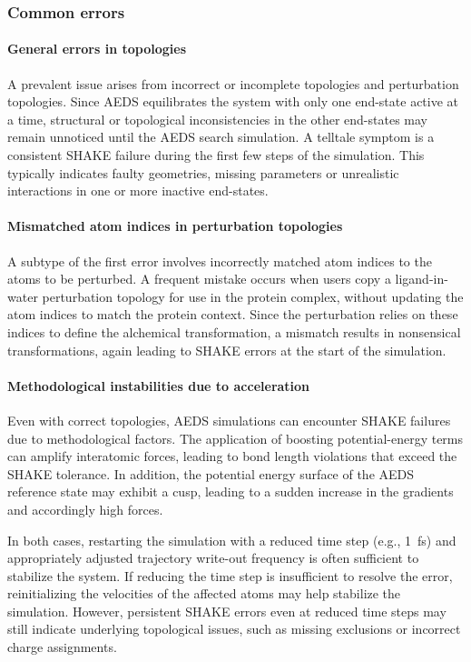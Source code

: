 \subsubsection{Common errors}

\paragraph{General errors in topologies}  
A prevalent issue arises from incorrect or incomplete topologies and perturbation topologies. Since AEDS equilibrates the system with only one end-state active at a time, structural or topological inconsistencies in the other end-states may remain unnoticed until the AEDS search simulation. A telltale symptom is a consistent SHAKE failure during the first few steps of the simulation. This typically indicates faulty geometries, missing parameters or unrealistic interactions in one or more inactive end-states.

\paragraph{Mismatched atom indices in perturbation topologies}  
A subtype of the first error involves incorrectly matched atom indices to the atoms to be perturbed. A frequent mistake occurs when users copy a ligand-in-water perturbation topology for use in the protein complex, without updating the atom indices to match the protein context. Since the perturbation relies on these indices to define the alchemical transformation, a mismatch results in nonsensical transformations, again leading to SHAKE errors at the start of the simulation.

\paragraph{Methodological instabilities due to acceleration}  
Even with correct topologies, AEDS simulations can encounter SHAKE failures due to methodological factors. The application of boosting potential-energy terms can amplify interatomic forces, leading to bond length violations that exceed the SHAKE tolerance. In addition, the potential energy surface of the AEDS reference state may exhibit a cusp, leading to a sudden increase in the gradients and accordingly high forces. 

In both cases, restarting the simulation with a reduced time step (e.g., 1~fs) and appropriately adjusted trajectory write-out frequency is often sufficient to stabilize the system. If reducing the time step is insufficient to resolve the error, reinitializing the velocities of the affected atoms may help stabilize the simulation. However, persistent SHAKE errors even at reduced time steps may still indicate underlying topological issues, such as missing exclusions or incorrect charge assignments.

